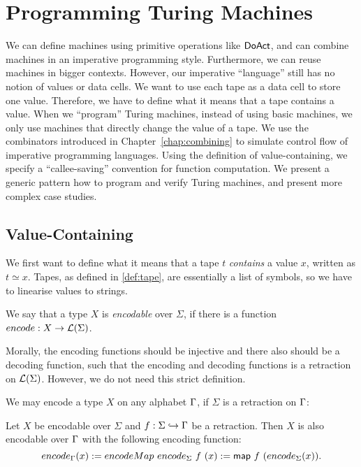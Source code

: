 \chapter{Programming Turing Machines}
\label{chap:programming}

We can define machines using primitive operations like $\mathsf{DoAct}$, and can combine machines in an imperative programming style.  Furthermore, we can
reuse machines in bigger contexts.  However, our imperative ``language'' still has no notion of values or data cells.  We want to use each tape as a
data cell to store one value.  Therefore, we have to define what it means that a tape contains a value.  When we ``program'' Turing machines, instead
of using basic machines, we only use machines that directly change the value of a tape.  We use the combinators introduced in
Chapter~\ref{chap:combining} to simulate control flow of imperative programming languages.  Using the definition of value-containing, we specify a
``callee-saving'' convention for function computation.  We present a generic pattern how to program and verify Turing machines, and present more
complex case studies.


\section{Value-Containing}
\label{sec:value-containing}

We first want to define what it means that a tape $t$ \emph{contains} a value $x$, written as $t \simeq x$.  Tapes, as defined in \ref{def:tape}, are
essentially a list of symbols, so we have to linearise values to strings.

\begin{definition}
  We say that a type $X$ is \emph{encodable} over $\Sigma$, if there is a function $encode : X \rightarrow \mathcal{L}(\Sigma)$.
\end{definition}

Morally, the encoding functions should be injective and there also should be a decoding function, such that the encoding and decoding functions is a
retraction on $\mathcal{L}(\Sigma)$.  However, we do not need this strict definition.

We may encode a type $X$ on any alphabet $\Gamma$, if $\Sigma$ is a retraction on $\Gamma$:
\begin{definition}
  \label{def:Encode_map}
  Let $X$ be encodable over $\Sigma$ and $f : \Sigma \hookrightarrow \Gamma$ be a retraction.  Then $X$ is also encodable over $\Gamma$ with the following
  encoding function:
  \[ encode_\Gamma(x) := encodeMap~encode_\Sigma~f~(x) := \mathsf{map}~f~(encode_\Sigma(x)). \]
\end{definition}

